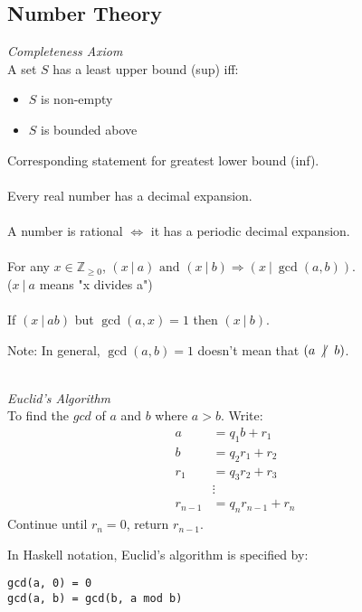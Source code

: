 \documentclass{scrartcl}
\newcommand{\Z}{\mathbb{Z}}
\begin{document}
\subsection{Number Theory}
\textit{Completeness Axiom}
\\
A set $ S $ has a least upper bound (sup) iff:
\begin{itemize}
\item $ S $ is non-empty
\item $ S $ is bounded above
\end{itemize}
Corresponding statement for greatest lower bound (inf).
\\\\
Every real number has a decimal expansion.
\\\\
A number is rational $ \Leftrightarrow $ it has a periodic decimal expansion.
\\\\
For any $ x \in \Z_{\geq 0} $, $ (x \ | \ a) \textrm{ and } (x \ | \ b) \Rightarrow (x \ | \ \gcd(a, b)) $.
\\
($ x \ | \ a  $ means "x divides a")
\\\\
If $  (x \ | \ ab) $ but $ \gcd(a, x) = 1 $ then $ (x \ | \ b ) $.
\\
\begin{tcolorbox}[breakable]
Note: In general, $ \gcd(a, b) = 1 $ doesn't mean that $ (a \ \centernot| \ b) $.
\end{tcolorbox}
\noindent
\\
\textit{Euclid's Algorithm}
\\
To find the $ gcd $ of $ a $ and $ b $ where $ a > b $. Write:
\begin{align}
a & = q_{1} b + r_{1} \\
b & = q_{2} r_{1} + r_{2} \\
r_{1} & = q_{3} r_{2} + r_{3} \\
& \vdots \\
r_{n-1} & = q_{n} r_{n-1} + r_{n}
\end{align}
Continue until $ r_{n} = 0 $, return $ r_{n-1} $.
\\
\begin{tcolorbox}[breakable]
In Haskell notation, Euclid's algorithm is specified by:
\begin{verbatim}
gcd(a, 0) = 0
gcd(a, b) = gcd(b, a mod b)
\end{verbatim}
\end{tcolorbox}
\noindent
\\
\end{document}
